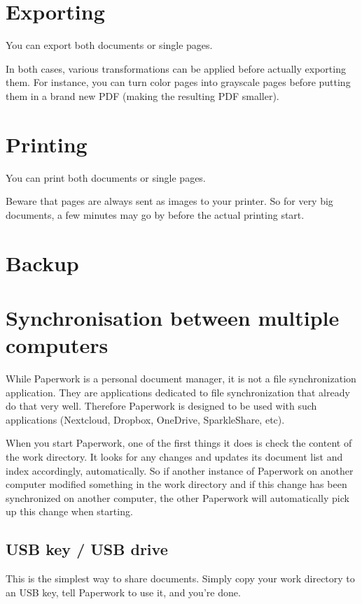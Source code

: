 \documentclass[10pt,a4paper]{article}
\begin{document}
\section{Exporting}

You can export both documents or single pages.

In both cases, various transformations can be applied before actually exporting
them. For instance, you can turn color pages into grayscale pages before
putting them in a brand new PDF (making the resulting PDF smaller).


\section{Printing}

You can print both documents or single pages.

Beware that pages are always sent as images to your printer. So for very big
documents, a few minutes may go by before the actual printing start.


\section{Backup}

\section{Synchronisation between multiple computers}

While Paperwork is a personal document manager, it is not a file
synchronization application. They are applications dedicated to file
synchronization that already do that very well. Therefore Paperwork is designed
to be used with such applications (Nextcloud, Dropbox, OneDrive, SparkleShare,
etc).

When you start Paperwork, one of the first things it does is check
the content of the work directory. It looks for any changes and updates
its document list and index accordingly, automatically. So if another instance
of Paperwork on another computer modified something in the work directory
and if this change has been synchronized on another computer, the other
Paperwork will automatically pick up this change when starting.


\subsection{USB key / USB drive}

This is the simplest way to share documents. Simply copy your work directory
to an USB key, tell Paperwork to use it, and you're done.
\end{document}
